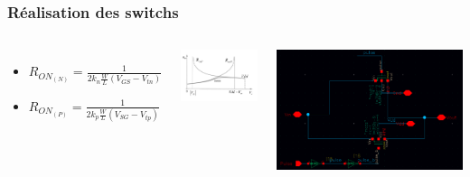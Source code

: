 \documentclass{beamer}
\begin{document}

\begin{frame}
\frametitle{R\'ealisation des switchs}

\begin{columns}[T]
  \begin{itemize}
    \item[] $R_{ON_{(N)}} = \frac{1}{2k_n \frac{W}{L} (V_{GS} - V_{tn})}$
    \item[] $R_{ON_{(P)}} = \frac{1}{2k_p \frac{W}{L} (V_{SG} - V_{tp})}$
  \end{itemize}
  \includegraphics[width=\linewidth]{switch_fonct.png}

  \hspace*{-0.5cm}
  \includegraphics[width=\linewidth]{switchs_.png}
\end{columns}

\end{frame}
\end{document}
